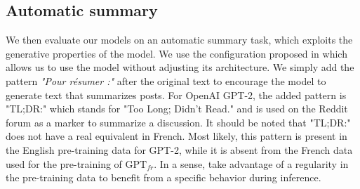 \begin{table}[!ht]
\footnotesize
{}
\caption{Perplexity of our models. We do not update the models on the training set and the perplexity is directly measured on the test set which are identical for two benchmarks. The $n$-gram model is trained on the corresponding training corpora.}
\end{table}


\subsection{Automatic summary} 

We then evaluate our models on an automatic summary task, which exploits the generative properties of the model. We use the configuration proposed in \cite{radford_2018} which allows us to use the model without adjusting its architecture. We simply add the pattern \textit{"Pour résumer :"} after the original text to encourage the model to generate text that summarizes posts. For OpenAI GPT-2, the added pattern is "TL;DR:" which stands for "Too Long; Didn't Read." and is used on the Reddit forum as a marker to summarize a discussion. It should be noted that "TL;DR:" does not have a real equivalent in French. Most likely, this pattern is present in the English pre-training data for GPT-2, while it is absent from the French data used for the pre-training of $\text{GPT}_{fr}$. In a sense, \cite{radford_2018} take advantage of a regularity in the pre-training data to benefit from a specific behavior during inference.


